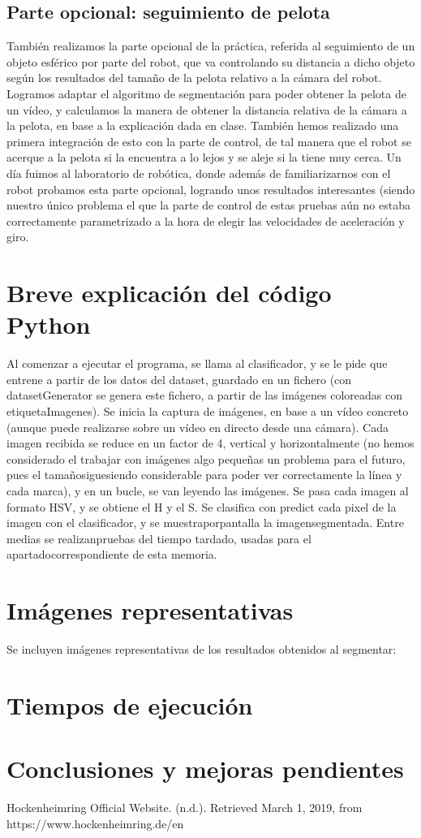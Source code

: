 \documentclass{article}
\begin{document}
\subsection{Parte opcional: seguimiento de pelota}
También realizamos la parte opcional de la práctica, referida al seguimiento de un objeto esférico por parte del robot, que va controlando su distancia a dicho objeto según los resultados del tamaño de la pelota relativo a la cámara del robot. Logramos adaptar el algoritmo de segmentación para poder obtener la pelota de un vídeo, y calculamos la manera de obtener la distancia relativa de la cámara a la pelota, en base a la explicación dada en clase. También hemos realizado una primera integración de esto con la parte de control, de tal manera que el robot se acerque a la pelota si la encuentra a lo lejos y se aleje si la tiene muy cerca. Un día fuimos al laboratorio de robótica, donde además de familiarizarnos con el robot probamos esta parte opcional, logrando unos resultados interesantes (siendo nuestro único problema el que la parte de control de estas pruebas aún no estaba correctamente parametrizado a la hora de elegir las velocidades de aceleración y giro.

\section{Breve explicación del código Python}
Al comenzar a ejecutar el programa, se llama al clasificador, y se le pide que entrene a partir de los datos del dataset, guardado en un fichero (con datasetGenerator se genera este fichero, a partir de las imágenes coloreadas con etiquetaImagenes). 
Se inicia la captura de imágenes, en base a un vídeo concreto (aunque puede realizarse sobre un vídeo en directo desde una cámara). Cada imagen recibida se reduce en un factor de 4, vertical y horizontalmente (no hemos considerado el trabajar con imágenes algo pequeñas un problema para el futuro, pues el tamañosiguesiendo considerable para poder ver correctamente la línea y cada marca), y en un bucle, se van leyendo las imágenes. Se pasa cada imagen al formato HSV, y se obtiene el H y el S. Se clasifica con predict cada pixel de la imagen con el clasificador, y se muestraporpantalla la imagensegmentada. Entre medias se realizanpruebas del tiempo tardado, usadas  para el apartadocorrespondiente de esta memoria.

\section{Imágenes representativas}
Se incluyen imágenes representativas de los resultados obtenidos al segmentar:

\section{Tiempos de ejecución}


\section{Conclusiones y mejoras pendientes} 


\begin{thebibliography}{1}

     Hockenheimring Official Website. (n.d.). Retrieved March 1, 2019, from https://www.hockenheimring.de/en

\end{thebibliography}
\end{document}
